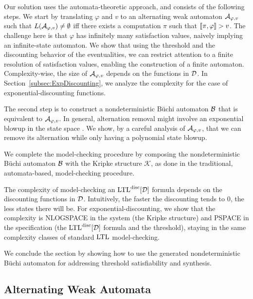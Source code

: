 \documentclass{llncs}
\newcommand{\LTL}{{\ensuremath{\rm LTL}}\xspace}
\newcommand{\K}{{\mathcal K}}
\newcommand{\B}{{\cal B}}
\newcommand{\D}{{\cal D}}
\newcommand{\A}{{\cal A}}
\renewcommand{\phi}{\varphi}
\newcommand{\DLTL}{\ensuremath{\LTL^{\text{disc}}[\D]}}
\newcommand{\LTLD}{\DLTL}
\begin{document}
Our solution uses the automata-theoretic approach, and consists of the following steps. We start by translating $\phi$ and $v$ to an alternating weak automaton $\A_{\phi,v}$ such that $L(\A_{\phi,v})\neq \emptyset$ iff there exists a computation $\pi$ such that $\sem{\pi,\phi}>v$.
The challenge here is that $\phi$ has infinitely many satisfaction values, naively implying an infinite-state automaton. We show that using the threshold and the discounting behavior of the eventualities, we can restrict attention to a finite resolution of satisfaction values, enabling the construction of a finite automaton.  Complexity-wise, the size of $\A_{\phi,v}$ depends on the functions in $\D$. In Section~\ref{subsec:ExpDiscounting}, we analyze the complexity for the case of exponential-discounting functions.

The second step is to construct a nondeterministic B\"uchi automaton $\B$ that is equivalent to $\A_{\phi,v}$. In general, alternation removal might involve an exponential blowup in the state space \cite{MH84}.
We show, by a careful analysis of $\A_{\phi,v}$, that we can remove its alternation while only having a polynomial state blowup.

We complete the model-checking procedure by composing the nondeterministic B\"uchi automaton $\B$ with the Kripke structure $\K$, as done in the traditional, automata-based, model-checking procedure.

The complexity of model-checking an $\LTLD$ formula depends on the discounting functions in $\D$. Intuitively, the faster the discounting tends to 0, the less states there will be. For exponential-discounting, we show that the complexity is NLOGSPACE in the system (the Kripke structure) and PSPACE in the specification (the $\LTLD$ formula and the threshold), staying in the same complexity classes of standard \LTL model-checking.

We conclude the section by showing how to use the generated nondeterministic B\"uchi automaton for 
addressing threshold satisfiability and synthesis.

\subsection{Alternating Weak Automata}
\end{document}
